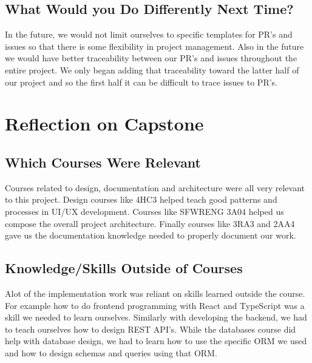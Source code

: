 \documentclass{article}
\begin{document}
\subsection{What Would you Do Differently Next Time?}
In the future, we would not limit ourselves to specific templates for PR's and issues so that there is some flexibility in project management. Also in the future we would have better traceability between our PR's and issues throughout the entire project. We only began adding that traceability toward the latter half of our project and so the first half it can be difficult to trace issues to PR's.

\section{Reflection on Capstone}

\subsection{Which Courses Were Relevant}

Courses related to design, documentation and architecture were all very relevant to this project. Design courses like 4HC3 helped teach good patterns and processes in UI/UX development. Courses like SFWRENG 3A04 helped us compose the overall project architecture. Finally courses like 3RA3 and 2AA4 gave us the documentation knowledge needed to properly document our work. 

\subsection{Knowledge/Skills Outside of Courses}


Alot of the implementation work was reliant on skills learned outside the course. For example how to do frontend programming with React and TypeScript was a skill we needed to learn ourselves. Similarly with developing the backend, we had to teach ourselves how to design REST API's. While the databases course did help with database design, we had to learn how to use the specific ORM we used and how to design schemas and queries using that ORM. 
\end{document}
